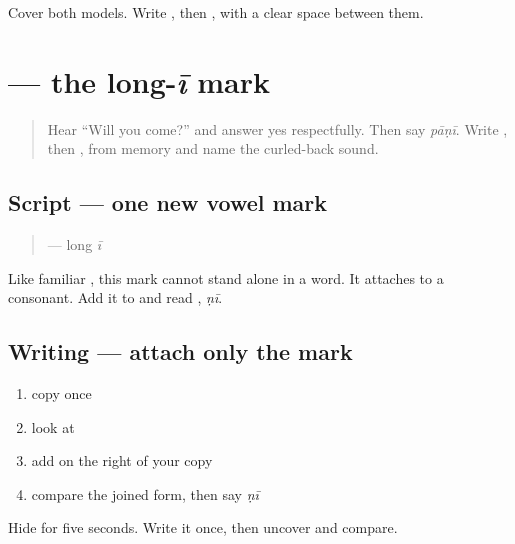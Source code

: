 \begin{tcolorbox}[breakable,colback=teal!4,colframe=teal!35!black,title={Before you move on}]
Cover both models. Write \textbf{}, then \textbf{}, with a clear space between them.
\end{tcolorbox}
\section[\texorpdfstring{\mw{ी} (long ī mark)}{ी (long ī mark)}]{ — the long-\emph{ī} mark}

\label{lesson:MW-W04-ii-matra}



\begin{quote}
Hear “Will you come?” and answer yes respectfully. Then say \emph{pāṇī}. Write \textbf{}, then \textbf{}, from memory and name the curled-back sound.
\end{quote}

\subsection*{Script — one new vowel mark}
\begin{quote}
\textbf{} — long \emph{ī}
\end{quote}

Like familiar \textbf{}, this mark cannot stand alone in a word. It attaches to a consonant. Add it to \textbf{} and read \textbf{}, \emph{ṇī}.

\subsection*{Writing — attach only the mark}

\begin{enumerate}
\raggedright
  \item copy \textbf{} once
  \item look at \textbf{}
  \item add \textbf{} on the right of your copy
  \item compare the joined form, then say \emph{ṇī}
\end{enumerate}

\begin{tcolorbox}[breakable,colback=teal!4,colframe=teal!35!black,title={Before you move on}]
Hide \textbf{} for five seconds. Write it once, then uncover and compare.
\end{tcolorbox}
